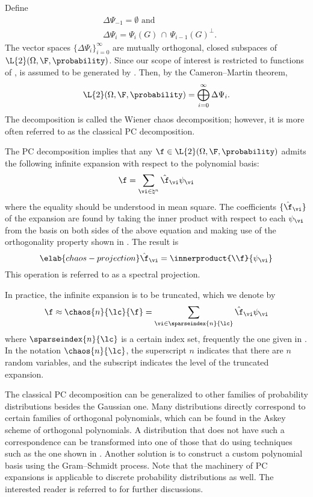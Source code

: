 Define
\begin{align*}
  & \Delta \Psi_{-1} = \emptyset \text{ and} \\
  & \Delta \Psi_i = \Psi_i(G) \, \cap \, \Psi_{i - 1}(G)^\perp.
\end{align*}
The vector spaces $\{ \Delta \Psi_i \}_{i = 0}^\infty$ are mutually orthogonal,
closed subspaces of $\L{2}(\Omega, \F, \probability)$. Since our scope of
interest is restricted to functions of \vx, \F is assumed to be generated by
\vx. Then, by the Cameron--Martin theorem,
\[
  \L{2}(\Omega, \F, \probability) = \bigoplus_{i = 0}^\infty \Delta \Psi_i.
\]
The decomposition is called the Wiener chaos decomposition; however, it is more
often referred to as the classical \ac{PC} decomposition.

The \ac{PC} decomposition implies that any $\f \in \L{2}(\Omega, \F,
\probability)$ admits the following infinite expansion with respect to the
polynomial basis:
\[
  \f = \sum_{\vi \in \natural^n} \hat{\f}_{\vi} \psi_{\vi}
\]
where the equality should be understood in mean square. The coefficients $\{
\hat{\f}_{\vi} \}$ of the expansion are found by taking the inner product with
respect to each $\psi_{\vi}$ from the basis on both sides of the above equation
and making use of the orthogonality property shown in
. The result is
\begin{equation} \elab{chaos-projection}
  \hat{\f}_{\vi} = \innerproduct{\\f}{\psi_{\vi}}
\end{equation}
This operation is referred to as a spectral projection.

In practice, the infinite expansion is to be truncated, which we denote by
\[
  \f \approx \chaos{n}{\lc}{\f} = \sum_{\vi \in \sparseindex{n}{\lc}} \hat{\f}_{\vi} \psi_{\vi}
\]
where $\sparseindex{n}{\lc}$ is a certain index set, frequently the one given in
. In the notation $\chaos{n}{\lc}$, the
superscript $n$ indicates that there are $n$ random variables, and the subscript
\lc indicates the level of the truncated expansion.

The classical \ac{PC} decomposition can be generalized to other families of
probability distributions besides the Gaussian one. Many distributions directly
correspond to certain families of orthogonal polynomials, which can be found in
the Askey scheme of orthogonal polynomials. A distribution that does not have
such a correspondence can be transformed into one of those that do using
techniques such as the one shown in . Another
solution is to construct a custom polynomial basis using the Gram--Schmidt
process. Note that the machinery of \ac{PC} expansions is applicable to discrete
probability distributions as well. The interested reader is referred to
\cite{xiu2010} for further discussions.
